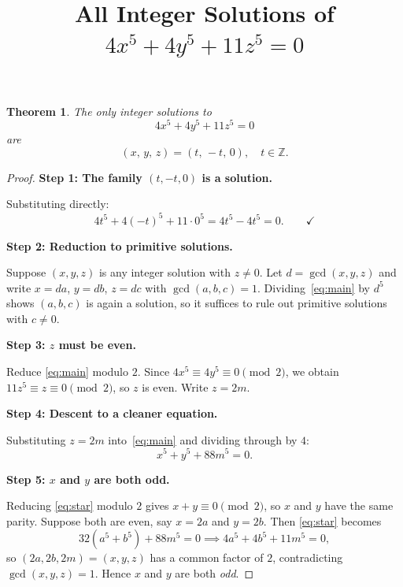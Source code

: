 \documentclass[12pt]{article}
\title{All Integer Solutions of $4x^5 + 4y^5 + 11z^5 = 0$}
\author{}
\date{}
\newtheorem{theorem}{Theorem}
\theoremstyle{definition}
\begin{document}
\maketitle

\begin{theorem}
The only integer solutions to
\begin{equation}\label{eq:main}
    4x^5 + 4y^5 + 11z^5 = 0
\end{equation}
are
\[
    (x,\, y,\, z) = (t,\, -t,\, 0), \quad t \in \mathbb{Z}.
\]
\end{theorem}

\begin{proof}

\textbf{Step 1: The family $(t, -t, 0)$ is a solution.}

Substituting directly:
\[
    4t^5 + 4(-t)^5 + 11 \cdot 0^5 = 4t^5 - 4t^5 = 0. \qquad \checkmark
\]

\medskip

\textbf{Step 2: Reduction to primitive solutions.}

Suppose $(x, y, z)$ is any integer solution with $z \neq 0$. Let $d = \gcd(x, y, z)$
and write $x = da$, $y = db$, $z = dc$ with $\gcd(a, b, c) = 1$.
Dividing~\eqref{eq:main} by $d^5$ shows $(a, b, c)$ is again a solution, so it
suffices to rule out primitive solutions with $c \neq 0$.

\medskip

\textbf{Step 3: $z$ must be even.}

Reduce \eqref{eq:main} modulo $2$. Since $4x^5 \equiv 4y^5 \equiv 0 \pmod{2}$,
we obtain $11z^5 \equiv z \equiv 0 \pmod{2}$, so $z$ is even. Write $z = 2m$.

\medskip

\textbf{Step 4: Descent to a cleaner equation.}

Substituting $z = 2m$ into~\eqref{eq:main} and dividing through by $4$:
\begin{equation}\label{eq:star}
    x^5 + y^5 + 88m^5 = 0. \tag{$*$}
\end{equation}

\medskip

\textbf{Step 5: $x$ and $y$ are both odd.}

Reducing \eqref{eq:star} modulo $2$ gives $x + y \equiv 0 \pmod{2}$, so $x$ and $y$
have the same parity. Suppose both are even, say $x = 2a$ and $y = 2b$. Then
\eqref{eq:star} becomes
\[
    32(a^5 + b^5) + 88m^5 = 0 \implies 4a^5 + 4b^5 + 11m^5 = 0,
\]
so $(2a, 2b, 2m) = (x, y, z)$ has a common factor of $2$, contradicting
$\gcd(x, y, z) = 1$. Hence $x$ and $y$ are both \emph{odd}.


\end{proof}
\end{document}

